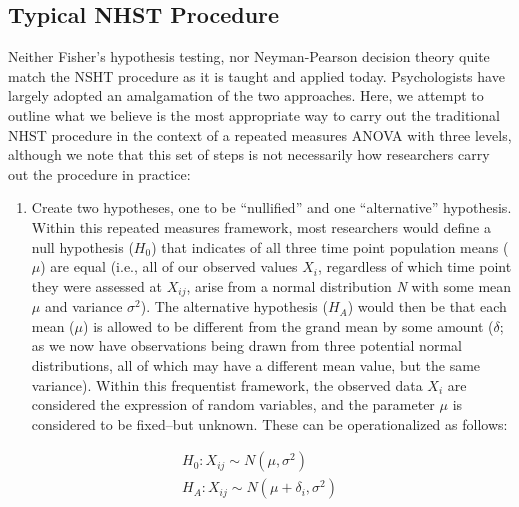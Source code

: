 \documentclass[,man, mask]{apa6}
\providecommand{\tightlist}{%
  \setlength{\itemsep}{0pt}\setlength{\parskip}{0pt}}
\theoremstyle{definition}
\theoremstyle{definition}
\theoremstyle{definition}
\theoremstyle{remark}
\begin{document}
\subsection{Typical NHST Procedure}\label{typical-nhst-procedure}

Neither Fisher's hypothesis testing, nor Neyman-Pearson decision theory
quite match the NSHT procedure as it is taught and applied today.
Psychologists have largely adopted an amalgamation of the two
approaches. Here, we attempt to outline what we believe is the most
appropriate way to carry out the traditional NHST procedure in the
context of a repeated measures ANOVA with three levels, although we note
that this set of steps is not necessarily how researchers carry out the
procedure in practice:

\begin{enumerate}
\def\labelenumi{\arabic{enumi})}
\tightlist
\item
  Create two hypotheses, one to be \enquote{nullified} and one
  \enquote{alternative} hypothesis. Within this repeated measures
  framework, most researchers would define a null hypothesis (\(H_0\))
  that indicates of all three time point population means (\(\mu\)) are
  equal (i.e., all of our observed values \(X_{i}\), regardless of which
  time point they were assessed at \(X_{ij}\), arise from a normal
  distribution \emph{N} with some mean \(\mu\) and variance
  \(\sigma^2\)). The alternative hypothesis (\(H_A\)) would then be that
  each mean (\(\mu\)) is allowed to be different from the grand mean by
  some amount (\(\delta\); as we now have observations being drawn from
  three potential normal distributions, all of which may have a
  different mean value, but the same variance). Within this frequentist
  framework, the observed data \(X_{i}\) are considered the expression
  of random variables, and the parameter \(\mu\) is considered to be
  fixed--but unknown. These can be operationalized as follows:
\end{enumerate}

\[
\begin{aligned}
  H_0: X_{ij} \sim N(\mu, \sigma^2) \\
  H_A: X_{ij} \sim N(\mu + \delta_i, \sigma^2)
\end{aligned}
\]
\end{document}
